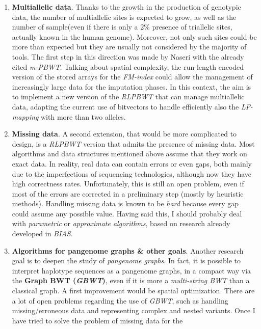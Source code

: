 \documentclass[a4paper,11pt, oneside]{article}
\begin{document}
\begin{enumerate}[leftmargin=.2in]
  \setlength\itemsep{-0.2em}
  \item \textbf{Multiallelic data}. Thanks to the growth in the
  production of genotypic data, the number of multiallelic sites is expected to
  grow, as well as the number of sample(even if there is only a 2\% presence of
  triallelic sites, actually known in the human genome). Moreover, not only
  such sites could be more than expected but they are 
  usually not considered by the majority of tools. The first step in this
  direction was made 
  by Naseri with the already cited \textit{m-PBWT}.
  Talking about spatial complexity, the run-length encoded version of the stored
  arrays for the \textit{FM-index} could allow the management of increasingly
  large data for the imputation phases.   
  In this context, the aim is to implement a new 
  version of the \textit{RLPBWT} that can manage multiallelic data, adapting the
  current use of bitvectors to handle efficiently also the \textit{LF-mapping}
  with more than two alleles. 
  \item \textbf{Missing data}. A second extension, that would be more
  complicated to 
  design, is a \textit{RLPBWT} version that admits the presence of
  missing data. Most algorithms and data structures mentioned above assume that
  they work on exact data. In reality, real data can contain errors or even
  gaps, both mainly due to the imperfections of sequencing technologies,
  although now they have high correctness rates. Unfortunately, this is
  still an open problem, even if most of the errors are corrected in a
  preliminary step (mostly by heuristic methods).
  Handling missing data is known to be \textit{hard} because every gap could
  assume any possible value. Having said this, I should  
  probably deal with \textit{parametric} or \textit{approximate algorithms},
  based on research already developed in \textit{BIAS}.
  \item \textbf{Algorithms for pangenome graphs \& other goals}. Another research
  goal is to deepen 
  the study of \textit{pangenome graphs}. In fact, it is possible to interpret
  haplotype sequences as a 
  pangenome graphs, in a compact way via the \textbf{Graph BWT (\textit{GBWT})},
  even if it is more a \textit{multi-string BWT} than a classical graph. A first
  improvement would be spatial optimization. There are a lot of open problems 
  regarding the use of \textit{GBWT}, such as handling missing/erroneous data
  and representing complex and nested 
  variants. Once I have tried to solve the problem of missing data for the

\end{enumerate}
\end{document}
